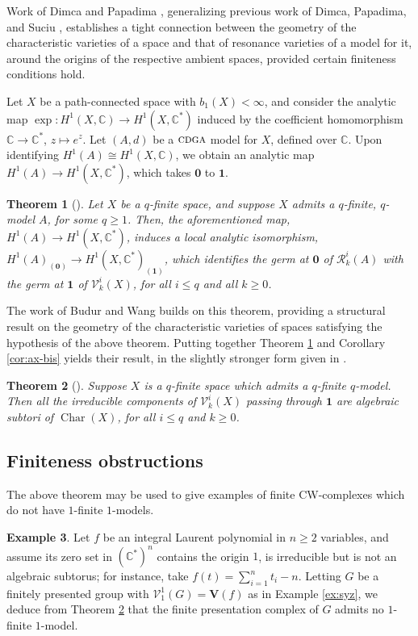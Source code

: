 \documentclass{article}
\numberwithin{equation}{section}
\newtheorem{theorem}{Theorem}[section]
\theoremstyle{definition}
\newtheorem{example}[theorem]{Example}
\renewcommand{\C}{\mathbb{C}}
\newcommand{\VV}{\mathcal{V}}
\newcommand{\RR}{\mathcal{R}}
\newcommand{\cdga}{\ensuremath{\textsc{cdga}}}
\DeclareMathOperator{\Char}{Char}
\newcommand{\one}{\mathbf{1}}
\newcommand{\zero}{\mathbf{0}}
\begin{document}
Work of Dimca and Papadima \cite{DP-ccm}, 
generalizing previous work of Dimca, Papadima, and Suciu \cite{DPS-duke},
establishes a tight connection between the geometry of the characteristic 
varieties of a space and that of resonance varieties of 
a model for it, around the origins of the respective ambient spaces, 
provided certain finiteness conditions hold.

Let $X$ be a path-connected space with $b_1(X)<\infty$, 
and consider the analytic map $\exp\colon H^1(X,\C)\to H^1(X,\C^*)$ 
induced by the coefficient homomorphism $\C\to \C^*$, $z\mapsto e^z$.
Let $(A,d)$ be a $\cdga$ model for $X$, defined over $\C$.  
Upon identifying $H^1(A)\cong H^1(X,\C)$, we obtain an analytic map 
$H^1(A)\to H^1(X,\C^*)$, which takes $\zero$ to $\one$.   

\begin{theorem}[\cite{DP-ccm}]
\label{thm:thmb}
Let $X$ be a $q$-finite space, and suppose $X$ admits a $q$-finite, 
$q$-model $A$, for some $q\ge 1$. Then, the aforementioned map,  
$H^1(A)\to H^1(X,\C^*)$, induces a local analytic isomorphism,  
$H^1(A)_{(\zero)} \to H^1(X,\C^*)_{(\one)}$, 
which identifies the germ at $\zero$ of $\RR^i_k(A)$ 
with the germ at $\one$ of $\VV^i_k(X)$, for all $i\le q$ and all $k\ge 0$. 
\end{theorem}

The work of Budur and Wang \cite{BW20} builds on this theorem, 
providing a structural result on the geometry of the characteristic varieties 
of spaces satisfying the hypothesis of the above theorem.   
Putting together Theorem \ref{thm:thmb} and Corollary \ref{cor:ax-bis} 
yields their result, in the slightly stronger form given in \cite{PS-jlms}.

\begin{theorem}[\cite{BW20}]
\label{thm:bw}
Suppose $X$ is a $q$-finite space which admits a $q$-finite $q$-model. 
Then all the irreducible components of 
$\VV^i_k(X)$ passing through $\one$ are algebraic subtori  of 
$\Char(X)$, for all $i\le q$ and $k\ge 0$.
\end{theorem}

\subsection{Finiteness obstructions}
\label{subsec:infvsBW}

The above theorem may be used to give examples 
of finite CW-complexes which do not have $1$-finite $1$-models.

\begin{example}
\label{ex:fpresgrp}
Let $f$ be an integral Laurent polynomial in $n\ge 2$ variables, and 
assume its zero set in $(\C^{*})^n$ contains the origin $1$, is irreducible 
but is not an algebraic subtorus; for instance, take $f(t)=\sum_{i=1}^n t_i -n$.  
Letting $G$ be a finitely presented group with $\VV^1_1(G)=\mathbf{V}(f)$ 
as in Example \ref{ex:syz}, we deduce from Theorem \ref{thm:bw} 
that the finite presentation complex of $G$ admits no $1$-finite $1$-model. 
\end{example}
\end{document}
